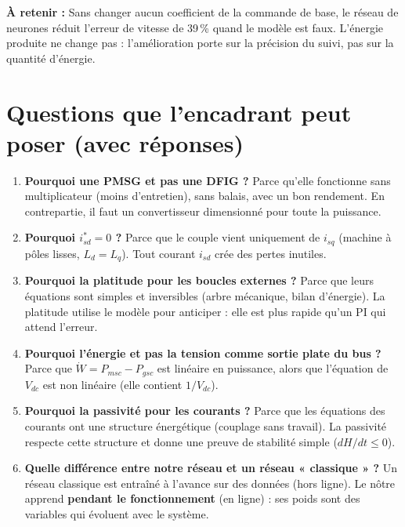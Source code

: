\documentclass[11pt,a4paper]{article}
\newcommand{\Resume}{\textbf{À retenir : }}
\begin{document}
\begin{resume}
\Resume
Sans changer aucun coefficient de la commande de base, le réseau de neurones réduit l'erreur de vitesse de
39\,\% quand le modèle est faux. L'énergie produite ne change pas : l'amélioration porte sur la précision du
suivi, pas sur la quantité d'énergie.
\end{resume}

\section{Questions que l'encadrant peut poser (avec réponses)}

\begin{enumerate}
\item \textbf{Pourquoi une PMSG et pas une DFIG ?}
Parce qu'elle fonctionne sans multiplicateur (moins d'entretien), sans balais, avec un bon rendement.
En contrepartie, il faut un convertisseur dimensionné pour toute la puissance.

\item \textbf{Pourquoi $i_{sd}^* = 0$ ?}
Parce que le couple vient uniquement de $i_{sq}$ (machine à pôles lisses, $L_d=L_q$). Tout courant $i_{sd}$
crée des pertes inutiles.

\item \textbf{Pourquoi la platitude pour les boucles externes ?}
Parce que leurs équations sont simples et inversibles (arbre mécanique, bilan d'énergie). La platitude
utilise le modèle pour anticiper : elle est plus rapide qu'un PI qui attend l'erreur.

\item \textbf{Pourquoi l'énergie et pas la tension comme sortie plate du bus ?}
Parce que $\dot W = P_{msc} - P_{gsc}$ est linéaire en puissance, alors que l'équation de $V_{dc}$ est
non linéaire (elle contient $1/V_{dc}$).

\item \textbf{Pourquoi la passivité pour les courants ?}
Parce que les équations des courants ont une structure énergétique (couplage sans travail). La passivité
respecte cette structure et donne une preuve de stabilité simple ($dH/dt\le0$).

\item \textbf{Quelle différence entre notre réseau et un réseau « classique » ?}
Un réseau classique est entraîné à l'avance sur des données (hors ligne). Le nôtre apprend
\textbf{pendant le fonctionnement} (en ligne) : ses poids sont des variables qui évoluent avec le système.


\end{enumerate}
\end{document}
